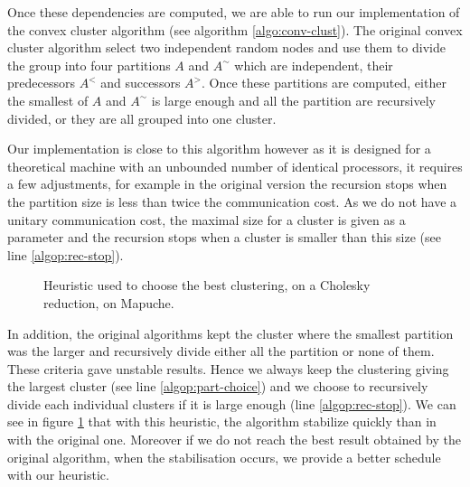 \documentclass[10pt, conference, compsocconf,pdftex,dvipsnames]{IEEEtran}
\begin{document}
Once these dependencies are computed, we are able to run our implementation of
the convex cluster algorithm (see algorithm \ref{algo:conv-clust}). The
original convex cluster algorithm select two independent random nodes and use
them to divide the group into four partitions $A$ and $A^{\sim}$ which are
independent, their predecessors $A^<$ and successors $A^>$. Once these
partitions are computed, either the smallest of $A$ and $A^{\sim}$ is large
enough and all the partition are recursively divided, or they are all grouped
into one cluster. 

Our implementation is close to this algorithm however as it is designed for a
theoretical machine with an unbounded number of identical processors, it
requires a few adjustments, for example in the original version the recursion
stops when the partition size is less than twice the communication cost. As we
do not have a unitary communication cost, the maximal size for a cluster is
given as a parameter and the recursion stops when a cluster is smaller than
this size (see line \ref{algop:rec-stop}). 

\begin{figure}[htb]
    \scalebox{0.65}{
        \centering
        
    }


    \caption{Heuristic used to choose the best clustering, on       
    a Cholesky reduction, on Mapuche.}
    \label{fig:Rdt}
\end{figure}

In addition, the original algorithms kept the cluster where the smallest
partition was the larger and recursively divide either all the partition or
none of them. These criteria gave unstable results. Hence we always keep the
clustering giving the largest cluster (see line \ref{algop:part-choice}) and
we choose to recursively divide each individual clusters if it is large enough
(line \ref{algop:rec-stop}). We can see in figure \ref{fig:Rdt} that with this
heuristic, the algorithm stabilize quickly than in with the original one.
Moreover if we do not reach the best result obtained by the original
algorithm, when the stabilisation occurs, we provide a better schedule with
our heuristic.
\end{document}
